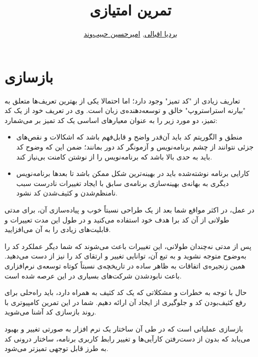 \documentclass{utap}
\title{تمرین  امتیازی}
\author{
    \href{mailto:bardia.eghbali@gmail.com?subject=[AP\%20S98\%20Refactoring]\%20}{بردیا اقبالی},
    \href{mailto:ahhabibvand@gmail.com?subject=[AP\%20S98\%20Refactoring]\%20}{امیرحسین حبیب‌وند}
}
\begin{document}
\lstset{
    numbers=left,
    frame=leftline,
}

\maketitle

\section{بازسازی}
تعاریف زیادی از
"ﮐﺪ ﺗﻤﯿﺰ"
وجود دارد؛ اما احتمالا یکی از بهترین تعریف‌ها متعلق به
"ﺑﯿﺎرﻧﻪ اﺳﺘﺮاﺳﺘﺮوپ" 
خالق و توسعه‌دهنده‌ی زبان  است. وی در تعریف خود از یک کد تمیز، دو مورد زیر را به عنوان معیار‌های اساسی یک کد تمیز بر می‌شمارد:

    \begin{itemize}
        \item
منطق و الگوریتم کد باید آن‌قدر واضح و قابل‌فهم باشد که اشکالات و نقص‌های ﺟﺰﺋﯽ نتوانند از چشم برنامه‌نویس و آزمونگر کد دور بمانند؛ ضمن این که وضوح کد باید به حدی بالا باشد که برنامه‌نویس را از نوشتن کامنت بی‌نیاز کند.

        \item
کارایی
برنامه نوشته‌شده باید در بهینه‌ترین
شکل ممکن باشد تا بعدها برنامه‌نویس دیگری به بهانه‌ی بهینه‌سازی
برنامه‌ی سابق با ایجاد تغییرات نادرست سبب نامنظم‌شدن و کثیف‌شدن کد نشود.
    \end{itemize}

در عمل، در اکثر مواقع شما بعد از یک طراحی نسبتاً خوب و پیاده‌سازی آن، برای مدتی طولانی از آن کد برا هدف خود استفاده می‌کنید و در طول این مدت تعییرات و قابلیت‌های زیادی را به آن می‌افزایید.

پس از مدتی نه‌چندان طولانی، این تغییرات باعث می‌شوند که شما دیگر عملکرد کد را به‌وضوح متوجه نشوید و به تبع آن، توانایی تغییر و ارتقای کد را نیز از دست می‌دهید. همین زنجیره‌ی اتفاقات به ظاهر ساده در تاریخچه‌ی نسبتاً کوتاه توسعه‌ی نرم‌افزاری باعث نابود‌شدن شرکت‌های بسیاری در این عرصه شده است.

حال با توجه به خطرات و مشکلاتی که یک کد کثیف به همراه دارد، باید راه‌حلی برای رفع کثیف‌بودن کد و جلو‌‌گیری از ایجاد آن اراﺋﻪ دهیم. شما در این تمرین کامپیوتری با روند بازسازی کد آشنا می‌شوید.

بازسازی عملیاتی است که در طی آن ساختار یک نرم افزار به صورتی تغییر و بهبود می‌یابد که بدون از دست‌رفتن کارآیی‌ها و تغییر رابط کاربری برنامه، ساختار درونی کد به طرز قابل توجهی تمیزتر می‌شود.
\end{document}
